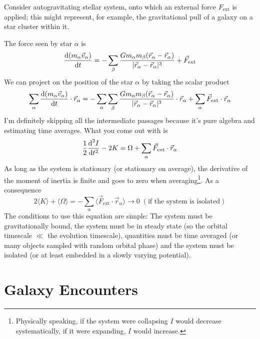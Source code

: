 Consider autogravitating stellar system, onto which an external force $F_{\text{ext}}$ is applied; this might represent, for example, the gravitational pull of a galaxy on a star cluster within it.
\par The force seen by star $\alpha$ is 
\begin{equation*}
    \frac{\text{d}(m_{\alpha}\vec{v}_{\alpha})}{\text{d}t} = -\sum_{\beta} \frac{Gm_{\alpha}m_{\beta}(\vec{r}_{\alpha}-\vec{r}_{\alpha})}{|\vec{r}_{\alpha}-\vec{r}_{\alpha}|^{3}}+\vec{F}_{\text{ext}}
\end{equation*}
We can project on the position of the star $\alpha$ by taking the scalar product
\begin{equation*}
    \sum_{\alpha}\frac{\text{d}(m_{\alpha}\vec{v}_{\alpha})}{\text{d}t}\cdot \vec{r}_{\alpha} = - \sum_{\alpha}\sum_{\beta}\frac{Gm_{\alpha}m_{\beta}(\vec{r}_{\alpha}-\vec{r}_{\alpha})}{|\vec{r}_{\alpha}-\vec{r}_{\alpha}|^{3}}\cdot \vec{r}_{\alpha}+\sum_{\alpha}\vec{F}_{\text{ext}}\cdot \vec{r}_{\alpha}
\end{equation*}
I'm definitely skipping all the intermediate passages because it's pure algebra and estimating time averages. What you come out with is
\begin{equation*}
    \frac{1}{2}\frac{\text{d}^{2}I}{\text{d}t^{2}} - 2K = \Omega +\sum_{\alpha}\vec{F}_{\text{ext}}\cdot \vec{r}_{\alpha}
\end{equation*}
As long as the system is stationary (or stationary on average), the derivative of the moment of inertia is finite and goes to zero when averaging\footnote{Physically speaking, if the system were collapsing $I$ would decrease systematically, if it were expanding, $I$ would increase.}. As a consequence
\begin{equation}
    2\langle K \rangle + \langle \Omega \rangle = -\sum_{\alpha}\langle \vec{F}_{\text{ext}}\cdot \vec{r}_{\alpha} \rangle \to 0 \; (\text{if the system is isolated})
    \label{eq:virial_theorem}
\end{equation}
The conditions to use this equation are simple: The system must be gravitationally bound, the system must be in steady state (so the orbital timescale $\ll$ the evolution timescale), quantities must be time averaged (or many objects sampled with random orbital phase) and the system must be isolated (or at least embedded in a slowly varying potential).

\section{Galaxy Encounters}

